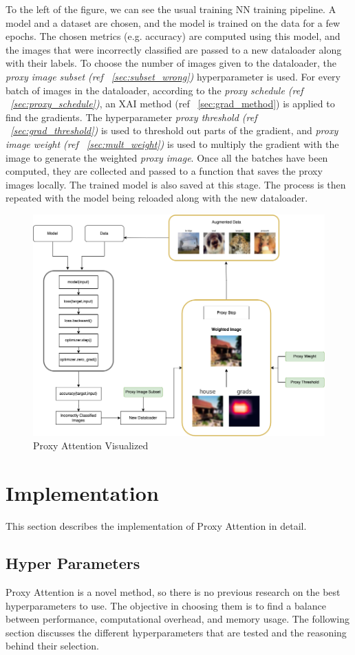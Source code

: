 \documentclass[a4paper,11pt,openright]{book}
\begin{document}
To the left of the figure, we can see the usual training NN training pipeline. A model and a dataset are chosen, and the model is trained on the data for a few epochs. The chosen metrics (e.g. accuracy) are computed using this model, and the images that were incorrectly classified are passed to a new dataloader along with their labels. To choose the number of images given to the dataloader, the \textit{proxy image subset (ref ~\ref{sec:subset_wrong})} hyperparameter is used. For every batch of images in the dataloader, according to the \textit{proxy schedule (ref ~\ref{sec:proxy_schedule})}, an XAI method (ref ~\ref{sec:grad_method}) is applied to find the gradients. The hyperparameter \textit{proxy threshold (ref ~\ref{sec:grad_threshold})} is used to threshold out parts of the gradient, and \textit{proxy image weight (ref ~\ref{sec:mult_weight})} is used to multiply the gradient with the image to generate the weighted \textit{proxy image}. Once all the batches have been computed, they are collected and passed to a function that saves the proxy images locally. The trained model is also saved at this stage. The process is then repeated with the model being reloaded along with the new dataloader.

\begin{figure}[!htb]
    \centering
    \includegraphics[width=.8\textwidth]{images/proxy_flow.png}
    \caption{Proxy Attention Visualized}
    \label{fig:proxy_flow}
\end{figure}

\section{Implementation}
This section describes the implementation of Proxy Attention in detail. 
\subsection{Hyper Parameters} \label{sec:hyperparameters}
Proxy Attention is a novel method, so there is no previous research on the best hyperparameters to use. The objective in choosing them is to find a balance between performance, computational overhead, and memory usage. The following section discusses the different hyperparameters that are tested and the reasoning behind their selection.
\end{document}
